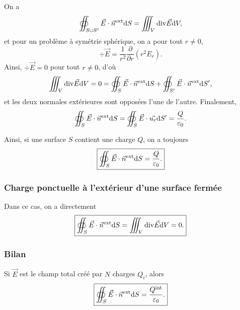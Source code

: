             On a 
            \begin{equation*}
                \oiint_{S\cup S'}\vec{E}\cdot\vec{n}^{\text{ext}}\mathrm{d} S=\iiint_{V}\mathrm{div}\vec{E}\mathrm{d} V,
            \end{equation*}
            et pour un problème à symétrie sphérique, on a pour tout $r\neq0$,
            \begin{equation*}
                \div\vec{E}=\frac{1}{r^{2}}\frac{\partial}{\partial r}\left(r^{2}E_r\right).
            \end{equation*}
            Ainsi, $\div\vec{E}=0$ pour tout $r\neq 0$, d'où 
            \begin{align*}
                \iiint_{V}\mathrm{div}\vec{E}\mathrm{d} V=0=\oiint_{S}\vec{E}\cdot\vec{n}^{\text{ext}}\mathrm{d} S+\oiint_{S'}\vec{E}\cdot\vec{n}^{\text{ext}}\mathrm{d} S',
            \end{align*}
            et les deux normales extérieures sont opposées l'une de l'autre. Finalement,
            \begin{equation*}
                \oiint_{S}\vec{E}\cdot\vec{n}^{\text{ext}}\mathrm{d} S=\oiint_{S}\vec{E}\cdot\vec{u_r}\mathrm{d} S'=\frac{Q}{\varepsilon_{0}}.
            \end{equation*}

            Ainsi, si une surface $S$ contient une charge $Q$, on a toujours
            \begin{equation*}
                \boxed{
                    \oiint_{S}\vec{E}\cdot\vec{n}^{\text{ext}}\mathrm{d} S=\frac{Q}{\varepsilon_{0}}.
                }
            \end{equation*}

        \subsubsection{Charge ponctuelle à l'extérieur d'une surface fermée}

            Dans ce cas, on a directement
            \begin{equation*}
                \boxed{
                    \oiint_{S}\vec{E}\cdot\vec{n}^{\text{ext}}\mathrm{d} S=\iiint_{V}\mathrm{div}\vec{E}\mathrm{d} V=0.
                }
            \end{equation*}

        \subsubsection{Bilan}

            Si $\vec{E}$ est le champ total créé par $N$ charges $Q_i$, alors
            \begin{equation*}
                \boxed{
                    \oiint_{S}\vec{E}\cdot\vec{n}^{\text{ext}}\mathrm{d} S=\frac{Q^{\text{int}}}{\varepsilon_{0}}.
                }
            \end{equation*}

